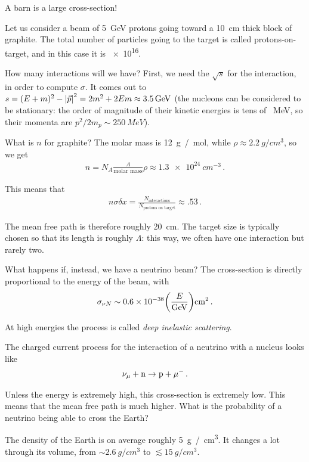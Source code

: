 \documentclass[main.tex]{subfiles}
\begin{document}
A barn is a large cross-section! 

Let us consider a beam of \SI{5}{GeV} protons going toward a \SI{10}{cm} thick block of graphite. 
The total number of particles going to the target is called protons-on-target, and in this case it is \num{e16}. 

How many interactions will we have? 
First, we need the \(\sqrt{s}\) for the interaction, in order to compute \(\sigma \). 
It comes out to \(s = (E + m)^2 - \abs{\vec{p}}^2 = 2m^2 + 2Em \approx \SI{3.5}{GeV}\)
(the nucleons can be considered to be stationary: the order of magnitude of their kinetic energies is tens of \SI{}{MeV}, so their momenta are \(p^2 / 2m_p \sim \SI{250}{MeV}\)). 

What is \(n\) for graphite? The molar mass is \SI{12}{g / mol}, while \(\rho \approx \SI{2.2}{g/cm^3}\), so we get 
%
\begin{align}
n = N_A \frac{A}{\text{molar mass}} \rho \approx \SI{1.3e24}{cm^{-3}}
\,.
\end{align}

This means that 
%
\begin{align}
n \sigma \delta x = \frac{N _{\text{interactions}}}{N _{\text{protons on target}}}\approx \num{.53}
\,.
\end{align}

The mean free path is therefore roughly \SI{20}{cm}. 
The target size is typically chosen so that its length is roughly \(\Lambda \): this way, we often have one interaction but rarely two. 

What happens if, instead, we have a neutrino beam? 
The cross-section is directly proportional to the energy of the beam, with 
%
\begin{align}
\sigma_{\nu N} \sim \num{.6e-38} \qty(\frac{E}{\SI{}{GeV}}) \SI{}{cm^2}
\,.
\end{align}

At high energies the process is called \emph{deep inelastic scattering}. 

The charged current process for the interaction of a neutrino with a nucleus looks like 
%
\begin{align}
\nu_\mu + \ce{n} \to \ce{p} + \mu^{-}
\,.
\end{align}

Unless the energy is extremely high, this cross-section is extremely low. 
This means that the mean free path is much higher. 
What is the probability of a neutrino being able to cross the Earth? 

The density of the Earth is on average roughly \SI{5}{g / cm^3}. It changes a lot through its volume, from \(\sim \SI{2.6}{g / cm^3}\) to \(\lesssim \SI{15}{g/cm^3}\). 
\end{document}

